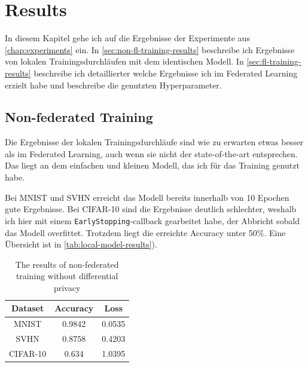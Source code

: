 \chapter{Results}\label{chap:results}

In diesem Kapitel gehe ich auf die Ergebnisse der Experimente aus \autoref{chap:experiments} ein. In \autoref{sec:non-fl-training-results} beschreibe ich Ergebnisse von lokalen Trainingsdurchläufen mit dem identischen Modell. In \autoref{sec:fl-training-results} beschreibe ich detaillierter welche Ergebnisse ich im Federated Learning erzielt habe und beschreibe die genutzten Hyperparameter.

\section{Non-federated Training} \label{sec:non-fl-training-results}
Die Ergebnisse der lokalen Trainingsdurchläufe sind wie zu erwarten etwas besser als im Federated Learning, auch wenn sie nicht der state-of-the-art entsprechen. Das liegt an dem einfachen und kleinen Modell, das ich für das Training genutzt habe.

Bei MNIST und SVHN erreicht das Modell bereits innerhalb von 10 Epochen gute Ergebnisse. Bei CIFAR-10 sind die Ergebnisse deutlich schlechter, weshalb ich hier mit einem \texttt{EarlyStopping}-callback gearbeitet habe, der Abbricht sobald das Modell overfittet. Trotzdem liegt die erreichte Accuracy unter 50\%. Eine Übersicht ist in \autoref{tab:local-model-results}).

\begin{table}
	\centering
	\begin{tabular}{|c|c|c|}
		\hline
		Dataset & Accuracy & Loss \\
		\hline
		MNIST & 0.9842 & 0.0535 \\
		SVHN & 0.8758 & 0.4203 \\
		CIFAR-10 & 0.634 & 1.0395 \\
		\hline
	\end{tabular}
	\caption{The results of non-federated training without differential privacy}
	\label{tab:local-model-results}
\end{table}

